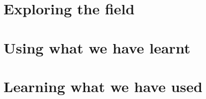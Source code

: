 \documentclass[
		twoside,openright,titlepage,numbers=noenddot,headinclude,%
                footinclude=true,cleardoublepage=empty,
                BCOR=5mm,paper=a4,fontsize=12pt, %
                british %
                ]{scrreprt}
\begin{document}
\cleardoublepage %




\part{Exploring the field} %







%


\cleardoublepage %



\part{Using what we have learnt}




\cleardoublepage %



\part{Learning what we have used}







\end{document}
